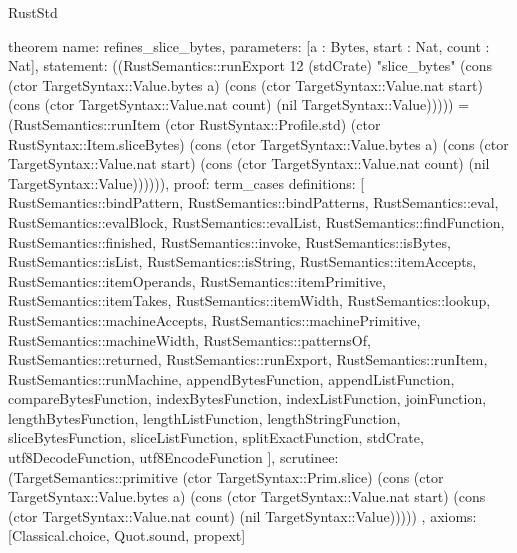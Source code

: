 \begin{lexlean}{RustStd}
\begin{semanticmodule}
theorem{
  name: refines_slice_bytes,
  parameters: [a : Bytes, start : Nat, count : Nat],
  statement: ((RustSemantics::runExport 12 (stdCrate) "slice_bytes" (cons (ctor TargetSyntax::Value.bytes a) (cons (ctor TargetSyntax::Value.nat start) (cons (ctor TargetSyntax::Value.nat count) (nil TargetSyntax::Value))))) = (RustSemantics::runItem (ctor RustSyntax::Profile.std) (ctor RustSyntax::Item.sliceBytes) (cons (ctor TargetSyntax::Value.bytes a) (cons (ctor TargetSyntax::Value.nat start) (cons (ctor TargetSyntax::Value.nat count) (nil TargetSyntax::Value)))))),
  proof: term_cases{
    definitions: [
      RustSemantics::bindPattern,
      RustSemantics::bindPatterns,
      RustSemantics::eval,
      RustSemantics::evalBlock,
      RustSemantics::evalList,
      RustSemantics::findFunction,
      RustSemantics::finished,
      RustSemantics::invoke,
      RustSemantics::isBytes,
      RustSemantics::isList,
      RustSemantics::isString,
      RustSemantics::itemAccepts,
      RustSemantics::itemOperands,
      RustSemantics::itemPrimitive,
      RustSemantics::itemTakes,
      RustSemantics::itemWidth,
      RustSemantics::lookup,
      RustSemantics::machineAccepts,
      RustSemantics::machinePrimitive,
      RustSemantics::machineWidth,
      RustSemantics::patternsOf,
      RustSemantics::returned,
      RustSemantics::runExport,
      RustSemantics::runItem,
      RustSemantics::runMachine,
      appendBytesFunction,
      appendListFunction,
      compareBytesFunction,
      indexBytesFunction,
      indexListFunction,
      joinFunction,
      lengthBytesFunction,
      lengthListFunction,
      lengthStringFunction,
      sliceBytesFunction,
      sliceListFunction,
      splitExactFunction,
      stdCrate,
      utf8DecodeFunction,
      utf8EncodeFunction
    ],
    scrutinee: (TargetSemantics::primitive (ctor TargetSyntax::Prim.slice) (cons (ctor TargetSyntax::Value.bytes a) (cons (ctor TargetSyntax::Value.nat start) (cons (ctor TargetSyntax::Value.nat count) (nil TargetSyntax::Value)))))
  },
  axioms: [Classical.choice, Quot.sound, propext]
}


\end{semanticmodule}
\end{lexlean}
